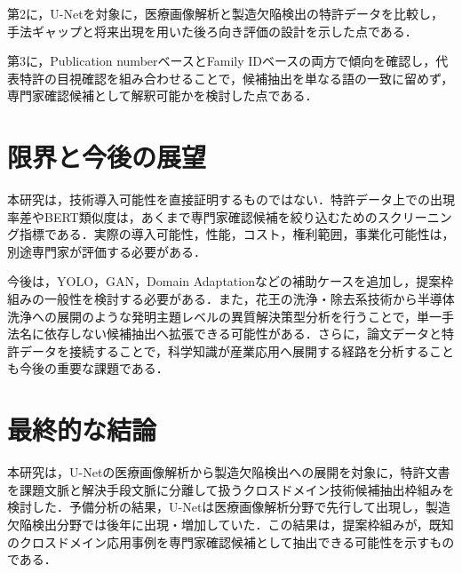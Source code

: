 第2に，U-Netを対象に，医療画像解析と製造欠陥検出の特許データを比較し，手法ギャップと将来出現を用いた後ろ向き評価の設計を示した点である．

第3に，Publication numberベースとFamily IDベースの両方で傾向を確認し，代表特許の目視確認を組み合わせることで，候補抽出を単なる語の一致に留めず，専門家確認候補として解釈可能かを検討した点である．

\section{限界と今後の展望}
本研究は，技術導入可能性を直接証明するものではない．特許データ上での出現率差やBERT類似度は，あくまで専門家確認候補を絞り込むためのスクリーニング指標である．実際の導入可能性，性能，コスト，権利範囲，事業化可能性は，別途専門家が評価する必要がある．

今後は，YOLO，GAN，Domain Adaptationなどの補助ケースを追加し，提案枠組みの一般性を検討する必要がある．また，花王の洗浄・除去系技術から半導体洗浄への展開のような発明主題レベルの異質解決策型分析を行うことで，単一手法名に依存しない候補抽出へ拡張できる可能性がある．さらに，論文データと特許データを接続することで，科学知識が産業応用へ展開する経路を分析することも今後の重要な課題である．

\section{最終的な結論}
本研究は，U-Netの医療画像解析から製造欠陥検出への展開を対象に，特許文書を課題文脈と解決手段文脈に分離して扱うクロスドメイン技術候補抽出枠組みを検討した．予備分析の結果，U-Netは医療画像解析分野で先行して出現し，製造欠陥検出分野では後年に出現・増加していた．この結果は，提案枠組みが，既知のクロスドメイン応用事例を専門家確認候補として抽出できる可能性を示すものである．
